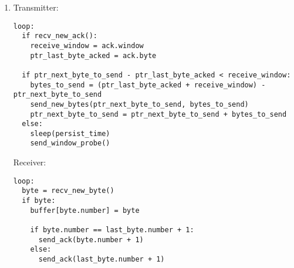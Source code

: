 \documentclass{article}
\begin{document}
\begin{enumerate}
      \item Transmitter:
            \begin{verbatim}
loop:
  if recv_new_ack():
    receive_window = ack.window
    ptr_last_byte_acked = ack.byte

  if ptr_next_byte_to_send - ptr_last_byte_acked < receive_window:
    bytes_to_send = (ptr_last_byte_acked + receive_window) - ptr_next_byte_to_send
    send_new_bytes(ptr_next_byte_to_send, bytes_to_send)
    ptr_next_byte_to_send = ptr_next_byte_to_send + bytes_to_send
  else:
    sleep(persist_time)
    send_window_probe()\end{verbatim}

            Receiver:
            \begin{verbatim}
loop:
  byte = recv_new_byte()
  if byte:
    buffer[byte.number] = byte

    if byte.number == last_byte.number + 1:
      send_ack(byte.number + 1)
    else:
      send_ack(last_byte.number + 1)
            \end{verbatim}

\end{enumerate}
\end{document}
